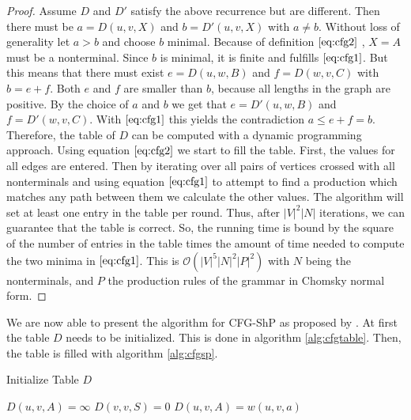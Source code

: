 \documentclass[]{article}
\numberwithin{equation}{section}
\begin{document}
\begin{proof}
	Assume $D$ and $D'$ satisfy the above recurrence but are different. Then there must be $a = D(u,v,X)$ and $b = D'(u,v,X)$ with $a\neq b$. Without loss of generality let $a > b$ and choose $b$ minimal. Because of definition $\eqref{eq:cfg2}$ , $X = A$ must be a nonterminal. Since $b$ is minimal, it is finite and fulfills $\eqref{eq:cfg1}$. But this means that there must exist $e = D(u,w,B)$ and $f = D(w,v,C)$ with $b = e+f$. Both $e$ and $f$ are smaller than $b$, because all lengths in the graph are positive. By the choice of $a$ and $b$ we get that $e = D'(u,w,B)$ and $f = D'(w,v,C)$. With $\eqref{eq:cfg1}$ this yields the contradiction $a \leq e+f=b$.\\
	
	Therefore, the table of $D$ can be computed with a dynamic programming approach. Using equation $\eqref{eq:cfg2}$ we start to fill the table. First, the values for all edges are entered. Then by iterating over all pairs of vertices crossed with all nonterminals and using equation $\eqref{eq:cfg1}$ to attempt to find a production which matches any path between them we calculate the other values. The algorithm will set at least one entry in the table per round. Thus, after $|V|^2|N|$ iterations, we can guarantee that the table is correct. So, the running time is bound by the square of the number of entries in the table times the amount of time needed to compute the two minima in $\eqref{eq:cfg1}$. This is $\mathcal{O}(|V|^5|N|^2|P|^2)$ with $N$ being the nonterminals, and $P$ the production rules of the grammar in Chomsky normal form.
\end{proof}

We are now able to present the algorithm for CFG-ShP as proposed by \cite{WWB08}. At first the table $D$ needs to be initialized. This is done in algorithm \ref{alg:cfgtable}. Then, the table is filled with algorithm \ref{alg:cfgsp}.

\begin{algorithm}[H]
	\caption{Initialize Table $D$}
	\label{alg:cfgtable}
	\begin{algorithmic}[1]
				\State $D(u,v,A) = \infty$
			\EndFor
		\EndFor
				\State $D(v,v,S) = 0$
			\EndFor
		\EndIf
					\State $D(u,v,A) = w(u,v,a)$
				\EndFor
			\EndIf
		\EndFor
		\EndProcedure
	\end{algorithmic}
\end{algorithm}
\end{document}
